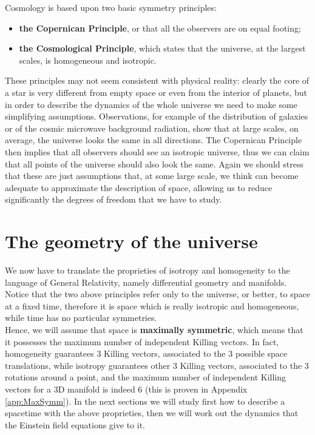 \label{chap:FRW}
Cosmology is based upon two basic symmetry principles:
\begin{itemize}
    \item \textbf{the Copernican Principle}, or that all the observers are on equal footing;
    \item \textbf{the Cosmological Principle}, which states that the universe, at the largest scales, is homogeneous and isotropic.
\end{itemize}
These principles may not seem consistent with physical reality: clearly the core of a star is very different from empty space or even from the interior of planets, but in order to describe the dynamics of the whole universe we need to make some simplifying assumptions. Observations, for example of the distribution of galaxies or of the cosmic microwave background radiation, show that at large scales, on average, the universe looks the same in all directions. The Copernican Principle then implies that all observers should see an isotropic universe, thus we can claim that all points of the universe should also look the same. Again we should stress that these are just assumptions that, at some large scale, we think can become adequate to approximate the description of space, allowing us to reduce significantly the degrees of freedom that we have to study.
\section{The geometry of the universe}
We now have to translate the proprieties of isotropy and homogeneity to the language of General Relativity, namely differential geometry and manifolds.\\ Notice that the two above principles refer only to the universe, or better, to space at a fixed time, therefore it is space which is really isotropic and homogeneous, while time has no particular symmetries.\\
Hence, we will assume that space is \textbf{maximally symmetric}, which means that it possesses the maximum number of independent Killing vectors. In fact, homogeneity guarantees 3 Killing vectors, associated to the 3 possible space translations, while isotropy guarantees other 3 Killing vectors, associated to the 3 rotations around a point, and the maximum number of independent Killing vectors for a 3D manifold is indeed 6 (this is proven in Appendix \ref{app:MaxSymm}).
In the next sections we will study first how to describe a spacetime with the above proprieties, then we will work out the dynamics that the Einstein field equations give to it.
